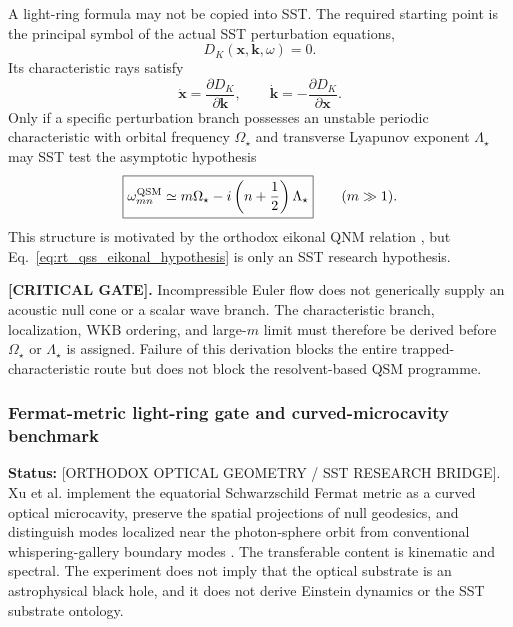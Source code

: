         A light-ring formula may not be copied into SST.  The required starting point is
        the principal symbol of the actual SST perturbation equations,
        \begin{equation}
            D_K(\mathbf x,\mathbf k,\omega)=0.
            \label{eq:rt_qss_principal_symbol}
        \end{equation}
        Its characteristic rays satisfy
        \begin{equation}
            \dot{\mathbf x}
            =
            \frac{\partial D_K}{\partial\mathbf k},
            \qquad
            \dot{\mathbf k}
            =
            -\frac{\partial D_K}{\partial\mathbf x}.
            \label{eq:rt_qss_characteristic_rays}
        \end{equation}
        Only if a specific perturbation branch possesses an unstable periodic
        characteristic with orbital frequency \(\Omega_\star\) and transverse
        Lyapunov exponent \(\Lambda_\star\) may SST test the asymptotic hypothesis
        \begin{equation}
            \boxed{
                \omega_{mn}^{\rm QSM}
                \simeq
                m\Omega_\star
                -
                i\left(n+\frac12\right)\Lambda_\star
            }
            \qquad
            (m\gg1).
            \label{eq:rt_qss_eikonal_hypothesis}
        \end{equation}
        This structure is motivated by the orthodox eikonal QNM relation
        \cite{CardosoMirandaBertiWitekZanchin2009,
        BertiEtAl2026BlackHoleSpectroscopy}, but Eq.~\eqref{eq:rt_qss_eikonal_hypothesis}
        is only an SST research hypothesis.

        \textbf{[CRITICAL GATE].}
        Incompressible Euler flow does not generically supply an acoustic null cone or
        a scalar wave branch.  The characteristic branch, localization, WKB ordering,
        and large-\(m\) limit must therefore be derived before
        \(\Omega_\star\) or \(\Lambda_\star\) is assigned.  Failure of this derivation
        blocks the entire trapped-characteristic route but does not block the
        resolvent-based QSM programme.

    \subsubsection*{Fermat-metric light-ring gate and curved-microcavity benchmark}

        \noindent
        \textbf{Status:} [ORTHODOX OPTICAL GEOMETRY / SST RESEARCH BRIDGE].
        Xu et al. implement the equatorial Schwarzschild Fermat metric as a curved
        optical microcavity, preserve the spatial projections of null geodesics, and
        distinguish modes localized near the photon-sphere orbit from conventional
        whispering-gallery boundary modes \cite{XuEtAl2026PhotonSphereModes}.  The
        transferable content is kinematic and spectral.  The experiment does not imply
        that the optical substrate is an astrophysical black hole, and it does not
        derive Einstein dynamics or the SST substrate ontology.

